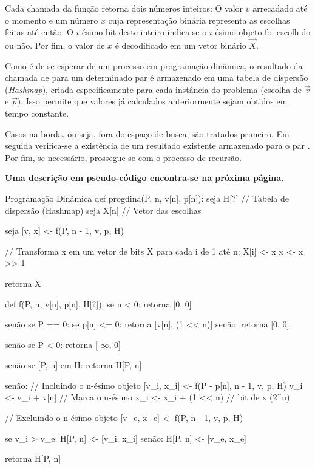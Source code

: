 \documentclass{homework}
\begin{document}
	Cada chamada da função  retorna dois números inteiros: O valor $v$ arrecadado até o momento e um número $x$ cuja representação binária representa as escolhas feitas até então. O $i$-ésimo bit deste inteiro indica se o $i$-ésimo objeto foi escolhido ou não. Por fim, o valor de $x$ é decodificado em um vetor binário $\vec{X}$.\par
	
	Como é de se esperar de um processo em programação dinâmica, o resultado da chamada de  para um determinado par \code{[P, n]} é armazenado em uma tabela de dispersão (\textit{Hashmap}), criada especificamente para cada instância do problema (escolha de $\vec{v}$ e $\vec{p}$). Isso permite que valores já calculados anteriormente sejam obtidos em tempo constante.\par
	
	Casos na borda, ou seja, fora do espaço de busca, são tratados primeiro. Em seguida verifica-se a existência de um resultado existente armazenado para o par \code{[P, n]}. Por fim, se necessário, prossegue-se com o processo de recursão.\par
	
	\textbf{Uma descrição em pseudo-código encontra-se na próxima página.}
	
	\newpage
	
	\begin{algor}{Programação Dinâmica}
	def progdina(P, n, v[n], p[n]):
		seja H[?] // Tabela de dispersão (Hashmap)
		seja X[n] // Vetor das escolhas
		
		seja [v, x] <- f(P, n - 1, v, p, H)
		
		// Transforma x em um vetor de bits X
		para cada i de 1 até n:
			X[i] <- x %
			x <- x >> 1
			
		retorna X
		
	def f(P, n, v[n], p[n], H[?]):
		se n < 0:
			retorna [0, 0]
			
		senão se P == 0:
			se p[n] <= 0:
				retorna [v[n], (1 << n)]
			senão:
				retorna [0, 0]
		
		senão se P < 0:
			retorna [-$\infty$, 0]
			
		senão se [P, n] em H:
			retorna H[P, n]
			
		senão:
			// Incluindo o n-ésimo objeto
			[v_i, x_i] <- f(P - p[n], n - 1, v, p, H)
			v_i <- v_i + v[n]     // Marca o n-ésimo
			x_i <- x_i + (1 << n) // bit de x (2^n)
			
			// Excluindo o n-ésimo objeto
			[v_e, x_e] <- f(P, n - 1, v, p, H)
			
			se v_i > v_e:
				H[P, n] <- [v_i, x_i]
			senão:
				H[P, n] <- [v_e, x_e]
				
			retorna H[P, n]
	\end{algor}
	
\end{document}
